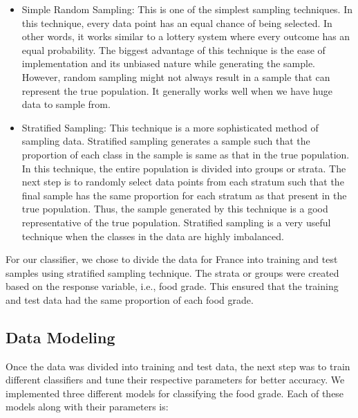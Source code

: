 \documentclass[sigconf]{acmart}
\begin{document}
\begin{itemize}
    \item Simple Random Sampling: This is one of the simplest sampling techniques. In this technique, every data point has an equal chance of being selected. In other words, it works similar to a lottery system where every outcome has an equal probability. The biggest advantage of this technique is the ease of implementation and its unbiased nature while generating the sample. However, random sampling might not always result in a sample that can represent the true population. It generally works well when we have huge data to sample from.
    \item Stratified Sampling: This technique is a more sophisticated method of sampling data. Stratified sampling generates a sample such that the proportion of each class in the sample is same as that in the true population. In this technique, the entire population is divided into groups or strata. The next step is to randomly select data points from each stratum such that the final sample has the same proportion for each stratum as that present in the true population. Thus, the sample generated by this technique is a good representative of the true population. Stratified sampling is a very useful technique when the classes in the data are highly imbalanced. 
\end{itemize}

For our classifier, we chose to divide the data for France into training and test samples using stratified sampling technique. The strata or groups were created based on the response variable, i.e., food grade. This ensured that the training and test data had the same proportion of each food grade.

\subsection{Data Modeling}
Once the data was divided into training and test data, the next step was to train different classifiers and tune their respective parameters for better accuracy. We implemented three different models for classifying the food grade. Each of these models along with their parameters is:
\end{document}

